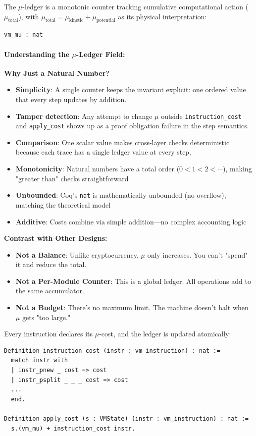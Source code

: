 The $\mu$-ledger is a monotonic counter tracking cumulative computational action ($\mu_{\text{total}}$), with $\mu_{\text{total}} = \mu_{\text{kinetic}} + \mu_{\text{potential}}$ as its physical interpretation:
\begin{lstlisting}
vm_mu : nat
\end{lstlisting}

\paragraph{Understanding the $\mu$-Ledger Field:}
\textbf{Why Just a Natural Number?}
\begin{itemize}
    \item \textbf{Simplicity}: A single counter keeps the invariant explicit: one ordered value that every step updates by addition.
    \item \textbf{Tamper detection}: Any attempt to change $\mu$ outside \texttt{instruction\_cost} and \texttt{apply\_cost} shows up as a proof obligation failure in the step semantics.
    \item \textbf{Comparison}: One scalar value makes cross-layer checks deterministic because each trace has a single ledger value at every step.
    \item \textbf{Monotonicity}: Natural numbers have a total order ($0 < 1 < 2 < \cdots$), making "greater than" checks straightforward
    \item \textbf{Unbounded}: Coq's \texttt{nat} is mathematically unbounded (no overflow), matching the theoretical model
    \item \textbf{Additive}: Costs combine via simple addition—no complex accounting logic
\end{itemize}

\textbf{Contrast with Other Designs:}
\begin{itemize}
    \item \textbf{Not a Balance}: Unlike cryptocurrency, $\mu$ only increases. You can't "spend" it and reduce the total.
    \item \textbf{Not a Per-Module Counter}: This is a global ledger. All operations add to the same accumulator.
    \item \textbf{Not a Budget}: There's no maximum limit. The machine doesn't halt when $\mu$ gets "too large."
\end{itemize}

Every instruction declares its $\mu$-cost, and the ledger is updated atomically:
\begin{lstlisting}
Definition instruction_cost (instr : vm_instruction) : nat :=
  match instr with
  | instr_pnew _ cost => cost
  | instr_psplit _ _ _ cost => cost
  ...
  end.

Definition apply_cost (s : VMState) (instr : vm_instruction) : nat :=
  s.(vm_mu) + instruction_cost instr.
\end{lstlisting}

